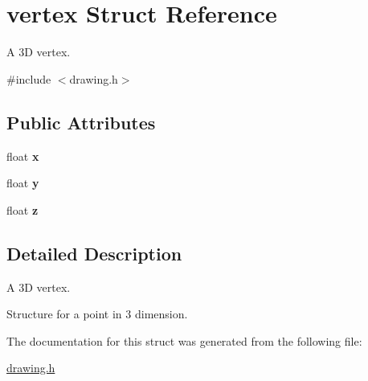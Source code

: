 \hypertarget{structvertex}{}\section{vertex Struct Reference}
\label{structvertex}


A 3D vertex.  




{\ttfamily \#include $<$drawing.\+h$>$}

\subsection*{Public Attributes}
\begin{DoxyCompactItemize}
\item 
\mbox{\label{structvertex_a664a5bbbbca4e1a99d85a163f6a08405}} 
float {\bfseries x}
\item 
\mbox{\label{structvertex_aea3246afd0395032be285a49bcd4b146}} 
float {\bfseries y}
\item 
\mbox{\label{structvertex_afe9862f7d3456ee2d352d94cbe5a84da}} 
float {\bfseries z}
\end{DoxyCompactItemize}


\subsection{Detailed Description}
A 3D vertex. 

Structure for a point in 3 dimension. 

The documentation for this struct was generated from the following file\+:\begin{DoxyCompactItemize}
\item 
\mbox{\hyperlink{drawing_8h}{drawing.\+h}}\end{DoxyCompactItemize}

